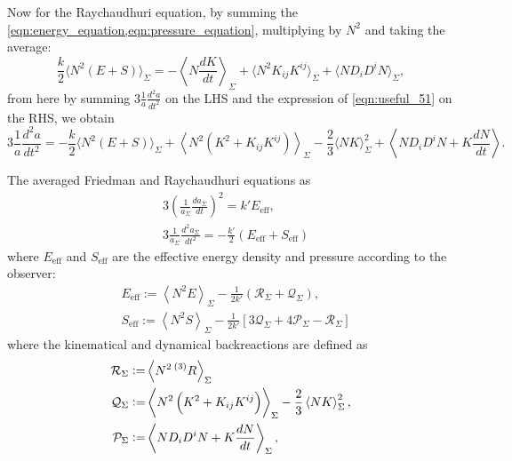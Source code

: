 Now for the Raychaudhuri equation, by summing the \cref{eqn:energy_equation,eqn:pressure_equation}, multiplying by $N^2$ and taking the average:
\begin{equation}
    \frac{k}{2}\langle N^2(E+S)\rangle_\Sigma=-\left\langle N\frac{dK}{dt}\right\rangle_\Sigma+\langle N^2K_{ij}K^{ij}\rangle_\Sigma+\langle ND_iD^iN\rangle_\Sigma,
\end{equation}
from here by summing $3\frac{1}{a}\frac{d^2a}{dt^2}$ on the LHS and the expression of \cref{eqn:useful_51} on the RHS, we obtain
\begin{equation}
    3\frac{1}{a}\frac{d^2a}{dt^2}=-\frac{k}{2}\langle N^2(E+S)\rangle_\Sigma+\left\langle N^2(K^2+K_{ij}K^{ij})\right\rangle_{\Sigma}-\frac{2}{3}\langle NK\rangle^2_\Sigma+\left\langle ND_iD^i N+K\frac{dN}{dt}\right\rangle.\nonumber
\end{equation}





The averaged Friedman and Raychaudhuri equations as
\begin{align}
    &3\left(\frac{1}{a_\Sigma}\frac{da_\Sigma}{dt}\right)^2=k'E_{\mathrm{eff}},\label{eqn:friedman_eqs_jf_1}\\
    &3\frac{1}{a_{\Sigma}}\frac{d^2a_{\Sigma}}{dt^2}=-\frac{k'}{2}\left(E_{\mathrm{eff}}+S_{\mathrm{eff}}\right)\label{eqn:raychaud_eqs_jf_1}
\end{align}
where $E_{\mathrm{eff}}$ and $S_{\mathrm{eff}}$ are the effective energy density and pressure according to the observer:
\begin{align}
    &E_{\mathrm{eff}}:=\left\langle N^2E\right\rangle_{\Sigma}-\frac{1}{2k'}\left(\mathcal{R}_\Sigma+\mathcal{Q}_{\Sigma}\right),
    \label{eqn:E_eff_1}\\
    &S_{\mathrm{eff}}:=\left\langle N^2 S\right\rangle_{\Sigma}-\frac{1}{2k'}\left[3\mathcal{Q}_{\Sigma}+4\mathcal{P}_{\Sigma}-\mathcal{R}_\Sigma\right]\label{eqn:S_eff_1}
\end{align}
where the kinematical and dynamical backreactions are defined as \cite{Buchert_2020}
\begin{align}
    \mathcal{R}_\Sigma :=&\left\langle N^2 \prescript{(3)}{}{R}\right\rangle_{\Sigma}\\
    \mathcal{Q}_{\Sigma}:=& \left\langle N^2\left(K^2+K_{ij}K^{ij}\right)\right\rangle_{\Sigma}-\frac{2}{3}\left\langle NK\right\rangle_{\Sigma}^2, \\
    \mathcal{P}_{\Sigma}:= &\left\langle N D_i D^i N+K\frac{dN}{dt}\right\rangle_{\Sigma},
\end{align}

